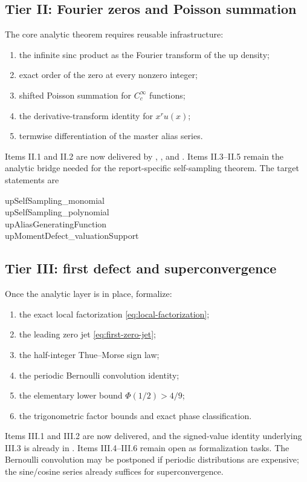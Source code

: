 \documentclass[11pt]{article}
\numberwithin{equation}{section}
\theoremstyle{definition}
\theoremstyle{remark}
\begin{document}
\subsection{Tier II: Fourier zeros and Poisson summation}

The core analytic theorem requires reusable infrastructure:
\begin{enumerate}[label=\textbf{II.\arabic*}]
\item the infinite sinc product as the Fourier transform of the up density;
\item exact order of the zero at every nonzero integer;
\item shifted Poisson summation for $C_c^\infty$ functions;
\item the derivative-transform identity for $x^ru(x)$;
\item termwise differentiation of the master alias series.
\end{enumerate}
Items II.1 and II.2 are now delivered by ,
, and
.  Items II.3--II.5 remain the analytic
bridge needed for the report-specific self-sampling theorem.
The target statements are
\begin{center}
\begin{minipage}{0.86\textwidth}\small\ttfamily
upSelfSampling\_monomial\\
upSelfSampling\_polynomial\\
upAliasGeneratingFunction\\
upMomentDefect\_valuationSupport
\end{minipage}
\end{center}

\subsection{Tier III: first defect and superconvergence}

Once the analytic layer is in place, formalize:
\begin{enumerate}[label=\textbf{III.\arabic*}]
\item the exact local factorization \eqref{eq:local-factorization};
\item the leading zero jet \eqref{eq:first-zero-jet};
\item the half-integer Thue--Morse sign law;
\item the periodic Bernoulli convolution identity;
\item the elementary lower bound $\Phi(1/2)>4/9$;
\item the trigonometric factor bounds and exact phase classification.
\end{enumerate}
Items III.1 and III.2 are now delivered, and the signed-value identity
underlying III.3 is already in .  Items
III.4--III.6 remain open as formalization tasks.
The Bernoulli convolution may be postponed if periodic distributions are expensive; the sine/cosine series already suffices for superconvergence.
\end{document}
